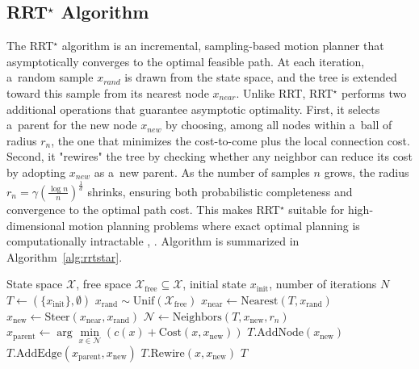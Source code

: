 \documentclass[letterpaper, 10 pt, conference]{ieeeconf}
\begin{document}
\subsection{RRT$^\star$ Algorithm}
The RRT$^\star$ algorithm is an incremental, sampling-based motion planner that
asymptotically converges to the optimal feasible path. At each iteration, a~random sample 
$x_{rand}$ is drawn from the state space, and the tree is extended toward this
sample from its nearest node $x_{near}$.
Unlike RRT, RRT$^\star$ performs two additional operations that guarantee asymptotic
optimality. First, it selects a~parent for the new node $x_{new}$ by choosing,
among all nodes within a~ball of radius $r_{n}$, the one that minimizes the
cost-to-come plus the local connection cost. Second, it "rewires" the tree by
checking whether any neighbor can reduce its cost by adopting $x_{new}$ as a~new
parent. As the number of samples $n$ grows, the radius  
$r_{n} = \gamma(\frac{\log{n}}{n})^{\frac{1}{d}}$ shrinks, ensuring both
probabilistic completeness and convergence to the optimal path cost.
This makes RRT$^\star$ suitable for high-dimensional motion planning problems where
exact optimal planning is computationally intractable
\cite{karaman2010incrementalsamplingbasedalgorithmsoptimal},
\cite{karaman2011samplingbasedalgorithmsoptimalmotion}.
Algorithm is summarized in Algorithm~\ref{alg:rrtstar}.
\begin{algorithm}[t]
\caption{Classical RRT$^\star$ algorithm}
\label{alg:rrtstar}
\begin{algorithmic}[1]
\REQUIRE State space $\mathcal{X}$, free space $\mathcal{X}_{\mathrm{free}} \subseteq \mathcal{X}$, 
initial state $x_{\mathrm{init}}$, number of iterations $N$
\STATE $T \gets (\{x_{\mathrm{init}}\}, \emptyset)$
    \STATE $x_{\mathrm{rand}} \sim \mathrm{Unif}(\mathcal{X}_{\mathrm{free}})$
    \STATE $x_{\mathrm{near}} \gets \mathrm{Nearest}(T, x_{\mathrm{rand}})$
    \STATE $x_{\mathrm{new}} \gets \mathrm{Steer}(x_{\mathrm{near}}, x_{\mathrm{rand}})$
        \STATE $\mathcal{N} \gets \mathrm{Neighbors}(T, x_{\mathrm{new}}, r_n)$
        \STATE $x_{\mathrm{parent}} \gets \arg\min\limits_{x \in \mathcal{N}} 
            \left( c(x) + \mathrm{Cost}(x, x_{\mathrm{new}}) \right)$
        \STATE $T.\mathrm{AddNode}(x_{\mathrm{new}})$
        \STATE $T.\mathrm{AddEdge}(x_{\mathrm{parent}}, x_{\mathrm{new}})$
                \STATE $T.\mathrm{Rewire}(x, x_{\mathrm{new}})$
            \ENDIF
        \ENDFOR
    \ENDIF
\ENDFOR
\STATE \RETURN $T$
\end{algorithmic}
\end{algorithm}
\end{document}
